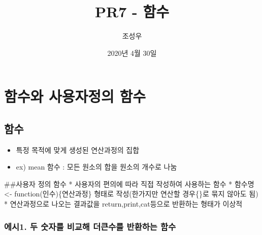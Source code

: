 \documentclass[
]{article}
\title{PR7 - 함수}
\author{조성우}
\date{2020년 4월 30일}
\newenvironment{Shaded}{\begin{snugshade}}{\end{snugshade}}
\newcommand{\CommentTok}[1]{\textcolor[rgb]{0.56,0.35,0.01}{\textit{#1}}}
\newcommand{\ControlFlowTok}[1]{\textcolor[rgb]{0.13,0.29,0.53}{\textbf{#1}}}
\newcommand{\DecValTok}[1]{\textcolor[rgb]{0.00,0.00,0.81}{#1}}
\newcommand{\KeywordTok}[1]{\textcolor[rgb]{0.13,0.29,0.53}{\textbf{#1}}}
\newcommand{\NormalTok}[1]{#1}
\newcommand{\OperatorTok}[1]{\textcolor[rgb]{0.81,0.36,0.00}{\textbf{#1}}}
\newcommand{\StringTok}[1]{\textcolor[rgb]{0.31,0.60,0.02}{#1}}
\providecommand{\tightlist}{%
  \setlength{\itemsep}{0pt}\setlength{\parskip}{0pt}}
\begin{document}
\maketitle

\hypertarget{uxd568uxc218uxc640-uxc0acuxc6a9uxc790uxc815uxc758-uxd568uxc218}{%
\section{함수와 사용자정의
함수}\label{uxd568uxc218uxc640-uxc0acuxc6a9uxc790uxc815uxc758-uxd568uxc218}}

\hypertarget{uxd568uxc218}{%
\subsection{함수}\label{uxd568uxc218}}

\begin{itemize}
\tightlist
\item
  특정 목적에 맞게 생성된 연산과정의 집합
\item
  ex) mean 함수 : 모든 원소의 합을 원소의 개수로 나눔
\end{itemize}

\#\#사용자 정의 함수 * 사용자의 편의에 따라 직접 작성하여 사용하는 함수
* 함수명 \textless- function(인수)\{연산과정\} 형태로 작성(한가지만
연산할 경우\{\}로 묶지 않아도 됨) * 연산과정으로 나오는 결과값을
return,print,cat등으로 반환하는 형태가 이상적

\hypertarget{uxc5d0uxc2dc1.-uxb450-uxc22buxc790uxb97c-uxbe44uxad50uxd574-uxb354uxd070uxc218uxb97c-uxbc18uxd658uxd558uxb294-uxd568uxc218}{%
\subsubsection{에시1. 두 숫자를 비교해 더큰수를 반환하는
함수}\label{uxc5d0uxc2dc1.-uxb450-uxc22buxc790uxb97c-uxbe44uxad50uxd574-uxb354uxd070uxc218uxb97c-uxbc18uxd658uxd558uxb294-uxd568uxc218}}

\begin{Shaded}
\end{Shaded}
\end{document}
